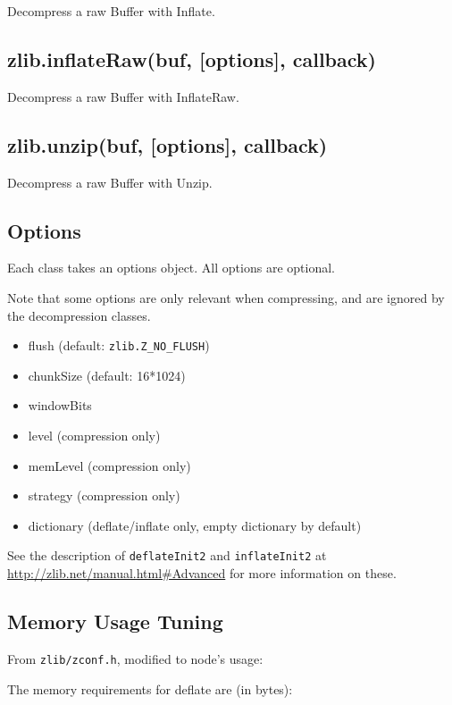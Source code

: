 Decompress a raw Buffer with Inflate.

\subsection{zlib.inflateRaw(buf, {[}options{]}, callback)}

Decompress a raw Buffer with InflateRaw.

\subsection{zlib.unzip(buf, {[}options{]}, callback)}

Decompress a raw Buffer with Unzip.

\subsection{Options}

Each class takes an options object. All options are optional.

Note that some options are only relevant when compressing, and are
ignored by the decompression classes.

\begin{itemize}
\item
  flush (default: \texttt{zlib.Z\_NO\_FLUSH})
\item
  chunkSize (default: 16*1024)
\item
  windowBits
\item
  level (compression only)
\item
  memLevel (compression only)
\item
  strategy (compression only)
\item
  dictionary (deflate/inflate only, empty dictionary by default)
\end{itemize}

See the description of \texttt{deflateInit2} and \texttt{inflateInit2}
at \url{http://zlib.net/manual.html#Advanced} for more information on
these.

\subsection{Memory Usage Tuning}

From \texttt{zlib/zconf.h}, modified to node's usage:

The memory requirements for deflate are (in bytes):

\begin{Shaded}
\begin{Highlighting}[]
\NormalTok{(} \NormalTok{)) +  (} \NormalTok{))}
\end{Highlighting}
\end{Shaded}

